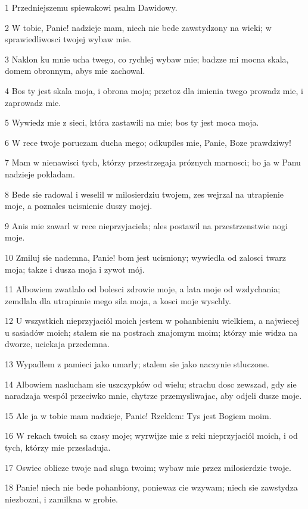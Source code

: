 \par 1 Przedniejszemu spiewakowi psalm Dawidowy.
\par 2 W tobie, Panie! nadzieje mam, niech nie bede zawstydzony na wieki; w sprawiedliwosci twojej wybaw mie.
\par 3 Naklon ku mnie ucha twego, co rychlej wybaw mie; badzze mi mocna skala, domem obronnym, abys mie zachowal.
\par 4 Bos ty jest skala moja, i obrona moja; przetoz dla imienia twego prowadz mie, i zaprowadz mie.
\par 5 Wywiedz mie z sieci, która zastawili na mie; bos ty jest moca moja.
\par 6 W rece twoje poruczam ducha mego; odkupiles mie, Panie, Boze prawdziwy!
\par 7 Mam w nienawisci tych, którzy przestrzegaja próznych marnosci; bo ja w Panu nadzieje pokladam.
\par 8 Bede sie radowal i weselil w milosierdziu twojem, zes wejrzal na utrapienie moje, a poznales ucisnienie duszy mojej.
\par 9 Anis mie zawarl w rece nieprzyjaciela; ales postawil na przestrzenstwie nogi moje.
\par 10 Zmiluj sie nademna, Panie! bom jest ucisniony; wywiedla od zalosci twarz moja; takze i dusza moja i zywot mój.
\par 11 Albowiem zwatlalo od bolesci zdrowie moje, a lata moje od wzdychania; zemdlala dla utrapianie mego sila moja, a kosci moje wyschly.
\par 12 U wszystkich nieprzyjaciól moich jestem w pohanbieniu wielkiem, a najwiecej u sasiadów moich; stalem sie na postrach znajomym moim; którzy mie widza na dworze, uciekaja przedemna.
\par 13 Wypadlem z pamieci jako umarly; stalem sie jako naczynie stluczone.
\par 14 Albowiem naslucham sie uszczypków od wielu; strachu dosc zewszad, gdy sie naradzaja wespól przeciwko mnie, chytrze przemysliwajac, aby odjeli dusze moje.
\par 15 Ale ja w tobie mam nadzieje, Panie! Rzeklem: Tys jest Bogiem moim.
\par 16 W rekach twoich sa czasy moje; wyrwijze mie z reki nieprzyjaciól moich, i od tych, którzy mie przesladuja.
\par 17 Oswiec oblicze twoje nad sluga twoim; wybaw mie przez milosierdzie twoje.
\par 18 Panie! niech nie bede pohanbiony, poniewaz cie wzywam; niech sie zawstydza niezbozni, i zamilkna w grobie.
